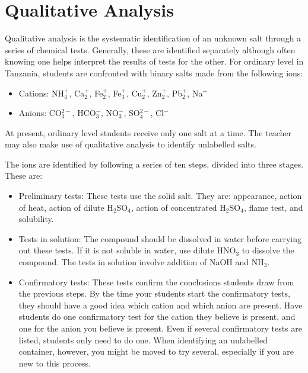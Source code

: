 \chapter{Qualitative Analysis}
\label{cha:qualana}

Qualitative analysis is the systematic identification of an unknown salt through a series of chemical tests. Generally, these are identified separately although often knowing one helps interpret the results of tests for the other. For ordinary level in Tanzania, students are confronted with binary salts made from the following ions:
\begin{itemize}
\item{Cations: NH$_{4}^{+}$, 
Ca$_{2}^{+}$, 
Fe$_{2}^{+}$, 
Fe$_{3}^{+}$, 
Cu$_{2}^{+}$, 
Zn$_{2}^{+}$, 
Pb$_{2}^{+}$, 
Na$^{+}$}
\item{Anions: CO$_{3}^{2-}$, 
HCO$_{3}^{-}$, 
NO$_{3}^{-}$, 
SO$_{4}^{2-}$, 
Cl$^{-}$}
\end{itemize}
At present, 
ordinary level students receive only one salt at a time. The teacher may also make use of qualitative analysis to identify unlabelled salts.

The ions are identified by following a series of ten steps, 
divided into three stages. 
These are:
\begin{itemize}
\item{Preliminary tests:
These tests use the solid salt. 
They are: appearance, 
action of heat, 
action of dilute H$_{2}$SO$_{4}$, 
action of concentrated H$_{2}$SO$_{4}$, 
flame test, 
and solubility.}
\item{Tests in solution:
The compound should be dissolved in water before carrying out these tests. 
If it is not soluble in water, 
use dilute HNO$_{3}$ to dissolve the compound. 
The tests in solution involve addition of NaOH and NH$_{3}$.}
\item{Confirmatory tests:
These tests confirm the conclusions students draw from the previous steps. 
By the time your students start the confirmatory tests, 
they should have a good idea which cation and which anion are present. 
Have students do one confirmatory test for the cation they believe is present, 
and one for the anion you believe is present. 
Even if several confirmatory tests are listed, 
students only need to do one. 
When identifying an unlabelled container, 
however, 
you might be moved to try several, 
especially if you are new to this process.}
\end{itemize}

